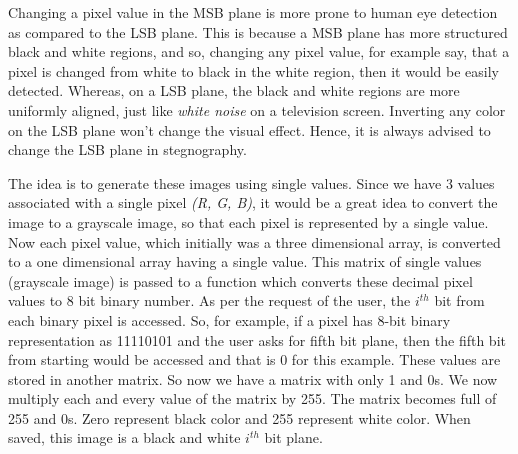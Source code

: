 \documentclass{report}
\begin{document}
Changing a pixel value in the MSB plane is more prone to human eye detection as compared to the LSB plane. This is because a MSB plane has more structured black and white regions, and so, changing any pixel value, for example say, that a pixel is changed from white to black in the white region, then it would be easily detected. Whereas, on a LSB plane, the black and white regions are more uniformly aligned, just like {\it white noise} on a television screen. Inverting any color on the LSB plane won't change the visual effect. Hence, it is always advised to change the LSB plane in stegnography.
\par The idea is to generate these images using single values. Since we have 3 values associated with a single pixel {\it (R, G, B)}, it would be a great idea to convert the image to a grayscale image, so that each pixel is represented by a single value. Now each pixel value, which initially was a three dimensional array, is converted to a one dimensional array having a single value. This matrix of single values (grayscale image) is passed to a function which converts these decimal pixel values to 8 bit binary number. As per the request of the user, the $i^{th}$ bit from each binary pixel is accessed. So, for example, if a pixel has 8-bit binary representation as 11110101 and the user asks for fifth bit plane, then the fifth bit from starting would be accessed and that is 0 for this example. These values are stored in another matrix. So now we have a matrix with only 1 and 0s. We now multiply each and every value of the matrix by 255. The matrix becomes full of 255 and 0s. Zero represent black color and 255 represent white color. When saved, this image is a black and white $i^{th}$ bit plane. 
\end{document}
